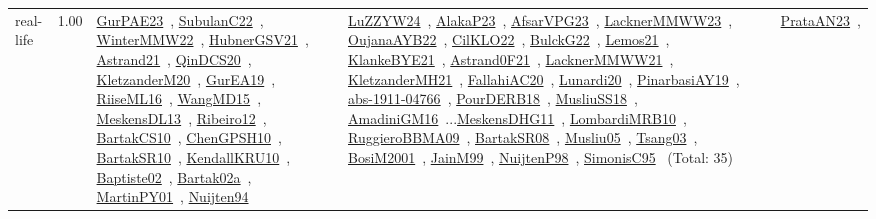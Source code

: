 {\begin{longtable}{p{3cm}r>{\raggedright\arraybackslash}p{6cm}>{\raggedright\arraybackslash}p{6cm}>{\raggedright\arraybackslash}p{8cm}}
\index{real-life}\index{Benchmarks!real-life}real-life &  1.00 & \href{../works/GurPAE23.pdf}{GurPAE23}~\cite{GurPAE23}, \href{../works/SubulanC22.pdf}{SubulanC22}~\cite{SubulanC22}, \href{../works/WinterMMW22.pdf}{WinterMMW22}~\cite{WinterMMW22}, \href{../works/HubnerGSV21.pdf}{HubnerGSV21}~\cite{HubnerGSV21}, \href{../works/Astrand21.pdf}{Astrand21}~\cite{Astrand21}, \href{../works/QinDCS20.pdf}{QinDCS20}~\cite{QinDCS20}, \href{../works/KletzanderM20.pdf}{KletzanderM20}~\cite{KletzanderM20}, \href{../works/GurEA19.pdf}{GurEA19}~\cite{GurEA19}, \href{../works/RiiseML16.pdf}{RiiseML16}~\cite{RiiseML16}, \href{../works/WangMD15.pdf}{WangMD15}~\cite{WangMD15}, \href{../works/MeskensDL13.pdf}{MeskensDL13}~\cite{MeskensDL13}, \href{../works/Ribeiro12.pdf}{Ribeiro12}~\cite{Ribeiro12}, \href{../works/BartakCS10.pdf}{BartakCS10}~\cite{BartakCS10}, \href{../works/ChenGPSH10.pdf}{ChenGPSH10}~\cite{ChenGPSH10}, \href{../works/BartakSR10.pdf}{BartakSR10}~\cite{BartakSR10}, \href{../works/KendallKRU10.pdf}{KendallKRU10}~\cite{KendallKRU10}, \href{../works/Baptiste02.pdf}{Baptiste02}~\cite{Baptiste02}, \href{../works/Bartak02a.pdf}{Bartak02a}~\cite{Bartak02a}, \href{../works/MartinPY01.pdf}{MartinPY01}~\cite{MartinPY01}, \href{../works/Nuijten94.pdf}{Nuijten94}~\cite{Nuijten94} & \href{../works/LuZZYW24.pdf}{LuZZYW24}~\cite{LuZZYW24}, \href{../works/AlakaP23.pdf}{AlakaP23}~\cite{AlakaP23}, \href{../works/AfsarVPG23.pdf}{AfsarVPG23}~\cite{AfsarVPG23}, \href{../works/LacknerMMWW23.pdf}{LacknerMMWW23}~\cite{LacknerMMWW23}, \href{../works/OujanaAYB22.pdf}{OujanaAYB22}~\cite{OujanaAYB22}, \href{../works/CilKLO22.pdf}{CilKLO22}~\cite{CilKLO22}, \href{../works/BulckG22.pdf}{BulckG22}~\cite{BulckG22}, \href{../works/Lemos21.pdf}{Lemos21}~\cite{Lemos21}, \href{../works/KlankeBYE21.pdf}{KlankeBYE21}~\cite{KlankeBYE21}, \href{../works/Astrand0F21.pdf}{Astrand0F21}~\cite{Astrand0F21}, \href{../works/LacknerMMWW21.pdf}{LacknerMMWW21}~\cite{LacknerMMWW21}, \href{../works/KletzanderMH21.pdf}{KletzanderMH21}~\cite{KletzanderMH21}, \href{../works/FallahiAC20.pdf}{FallahiAC20}~\cite{FallahiAC20}, \href{../works/Lunardi20.pdf}{Lunardi20}~\cite{Lunardi20}, \href{../works/PinarbasiAY19.pdf}{PinarbasiAY19}~\cite{PinarbasiAY19}, \href{../works/abs-1911-04766.pdf}{abs-1911-04766}~\cite{abs-1911-04766}, \href{../works/PourDERB18.pdf}{PourDERB18}~\cite{PourDERB18}, \href{../works/MusliuSS18.pdf}{MusliuSS18}~\cite{MusliuSS18}, \href{../works/AmadiniGM16.pdf}{AmadiniGM16}~\cite{AmadiniGM16}...\href{../works/MeskensDHG11.pdf}{MeskensDHG11}~\cite{MeskensDHG11}, \href{../works/LombardiMRB10.pdf}{LombardiMRB10}~\cite{LombardiMRB10}, \href{../works/RuggieroBBMA09.pdf}{RuggieroBBMA09}~\cite{RuggieroBBMA09}, \href{../works/BartakSR08.pdf}{BartakSR08}~\cite{BartakSR08}, \href{../works/Musliu05.pdf}{Musliu05}~\cite{Musliu05}, \href{../works/Tsang03.pdf}{Tsang03}~\cite{Tsang03}, \href{../works/BosiM2001.pdf}{BosiM2001}~\cite{BosiM2001}, \href{../works/JainM99.pdf}{JainM99}~\cite{JainM99}, \href{../works/NuijtenP98.pdf}{NuijtenP98}~\cite{NuijtenP98}, \href{../works/SimonisC95.pdf}{SimonisC95}~\cite{SimonisC95} (Total: 35) & \href{../works/PrataAN23.pdf}{PrataAN23}~\cite{PrataAN23}, 
\end{longtable}}
